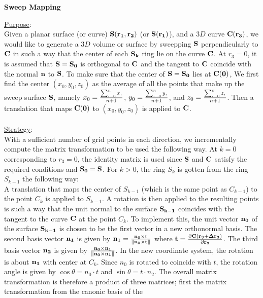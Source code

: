 \documentclass[12pt]{article}
\begin{document}
\begin{center}
\Large \bf Sweep Mapping
\end{center}
\underline{\underline{Purpose}}:\\
Given a planar surface (or curve) $\bf S(r_1,r_2)$ (or $ \bf S(r_1)$), and a 
$3D$ curve $\bf C(r_3)$, we would like to 
generate a $3D$ volume or surface by sweepping $\bf S$ perpendicularly
to $\bf C$ in such a way that the center of each $\bf S_k$ ring lie on
the curve $\bf C$. At $r_3 = 0$, it is assumed that $\bf S = S_0$ is
orthogonal to $\bf C$ and the tangent to $\bf C$ coincide with the
normal $\bf n $ to $\bf S$. To make sure that the center of $\bf S =
S_0$ lies at $\bf C(0)$, We first find the center $(x_0,y_0,z_0)$ as the
average of all the points that make up the sweep surface $\bf S$, namely
$x_0={\sum_{i=0}^n {x_i}\over n+1}$, $y_0={\sum_{i=0}^n {y_i}\over n+1}$,
and $z_0={\sum_{i=0}^n {z_i}\over n+1}$.
Then a translation that maps $\bf C(0)$ to $(x_0,y_0,z_0)$ is applied 
to $\bf C$.
\\
\\
\underline{\underline{Strategy}}:\\
With a sufficient number of grid points in each direction, 
we incrementally compute the matrix transformation to be used the
following way. At $k=0$ corresponding to $r_3=0$, the identity matrix is
used since $\bf S$ and $\bf C$ satisfy the required conditions and $\bf
S_0 = S$. For $k>0$, the ring $S_k$ is gotten from the ring $S_{k-1}$
the following way:\\
A translation that maps the center of $S_{k-1}$ (which is the same
point as $C_{k-1}$) to the point $C_k$ is applied to $S_{k-1}$. A
rotation is then applied to the resulting points is such a way that the
unit normal to the surface $\bf S_{k-1}$ coincides with the tangent to the
curve $\bf C$ at the point $C_k$. To implement this,
the unit vector $\bf n_0$  of the surface $\bf S_{k-1}$ is chosen to 
be the first vector in a new orthonormal basis. The second basis vector 
$\bf n_1$ is given by $\bf n_1 = {n_0\times t \over \| n_0\times t\|}$
where $\bf t = {\partial C (r_3+\Delta r_3) \over \partial r_3}$. The third 
basis vector $\bf n_2$ is given by $\bf n_0\times n_1\over \|n_0\times n_1\|$. In the
new coordinate system, the rotation is about $\bf n_1$ with center at
$C_k$. Since $n_0$ is rotated to coincide with $t$, the rotation angle
is given by $\cos \theta = n_0 \cdot t$ and $\sin \theta = t \cdot n_2$.
The overall matrix transformation is therefore a product of three matrices; 
first the matrix transformation from the canonic basis of the
\end{document}
